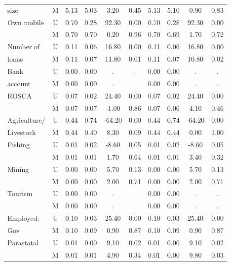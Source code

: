 \begin{table}[!ht]
{\begin{minipage}{\textwidth}
\begin{tabulary}{1\textwidth}{lCCCCCCCCC}
    size      & M     & 5.13  & 5.03  & 3.20  & 0.45  & 5.13  & 5.10  & 0.90  & 0.83 \\
    Own mobile & U     & 0.70  & 0.28  & 92.30 & 0.00  & 0.70  & 0.28  & 92.30 & 0.00 \\
          & M     & 0.70  & 0.70  & 0.20  & 0.96  & 0.70  & 0.69  & 1.70  & 0.72 \\
    Number of  & U     & 0.11  & 0.06  & 16.80 & 0.00  & 0.11  & 0.06  & 16.80 & 0.00 \\
      loans    & M     & 0.11  & 0.07  & 11.80 & 0.01  & 0.11  & 0.07  & 10.80 & 0.02 \\
    Bank  & U     & 0.00  & 0.00  & .     & .     & 0.00  & 0.00  & .     & . \\
        account  & M     & 0.00  & 0.00  & .     & .     & 0.00  & 0.00  & .     & . \\
    ROSCA & U     & 0.07  & 0.02  & 24.40 & 0.00  & 0.07  & 0.02  & 24.40 & 0.00 \\
          & M     & 0.07  & 0.07  & -1.00 & 0.86  & 0.07  & 0.06  & 4.10  & 0.46 \\
     Agriculture/  & U     & 0.44  & 0.74  & -64.20 & 0.00  & 0.44  & 0.74  & -64.20 & 0.00 \\
        Livestock  & M     & 0.44  & 0.40  & 8.30  & 0.09  & 0.44  & 0.44  & 0.00  & 1.00 \\
     Fishing & U     & 0.01  & 0.02  & -8.60 & 0.05  & 0.01  & 0.02  & -8.60 & 0.05 \\
          & M     & 0.01  & 0.01  & 1.70  & 0.64  & 0.01  & 0.01  & 3.40  & 0.32 \\
     Mining & U     & 0.00  & 0.00  & 5.70  & 0.13  & 0.00  & 0.00  & 5.70  & 0.13 \\
          & M     & 0.00  & 0.00  & 2.00  & 0.71  & 0.00  & 0.00  & 2.00  & 0.71 \\
     Tourism & U     & 0.00  & 0.00  & .     & .     & 0.00  & 0.00  & .     & . \\
          & M     & 0.00  & 0.00  & .     & .     & 0.00  & 0.00  & .     & . \\
     Employed:  & U     & 0.10  & 0.03  & 25.40 & 0.00  & 0.10  & 0.03  & 25.40 & 0.00 \\
        Gov  & M     & 0.10  & 0.09  & 0.90  & 0.87  & 0.10  & 0.09  & 0.90  & 0.87 \\
     Parastatal & U     & 0.01  & 0.00  & 9.10  & 0.02  & 0.01  & 0.00  & 9.10  & 0.02 \\
          & M     & 0.01  & 0.01  & 4.90  & 0.34  & 0.01  & 0.00  & 9.80  & 0.03 \\

\end{tabulary}
\end{minipage}}
\end{table}
